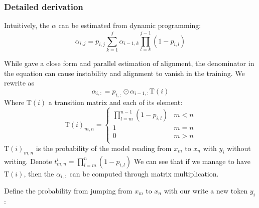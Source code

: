 \subsubsection{Detailed derivation}
\label{app:emma_estimation}
Intuitively, the $\alpha$ can be estimated from dynamic programming:
\begin{equation}
    \alpha_{i,j} = p_{i,j} \sum_{k=1}^j \alpha_{i-1, k} \prod_{l=k}^{j-1}(1 - p_{i,l})
    \label{eq:alpha_orig}
\end{equation}

While 
\citep{raffel_online_2017}
gave a close form and parallel estimation of alignment,
the denominator in the equation can cause instability and alignment to vanish in the training.
We rewrite  as 
\begin{equation}
    \alpha_{i,:} = p_{i,:} \odot \alpha_{i-1, :} \mathrm{T}(i)  
\end{equation}
Where $\mathrm{T}(i)$ a transition matrix and each of its element:
\begin{equation}
    \mathrm{T}(i)_{m,n} =
    \begin{cases}
    \prod_{l=m}^{n-1} (1 - p_{i,l}) & m < n\\
    1 & m = n\\
    0 & m > n \\
    \end{cases}
\end{equation}
$\mathrm{T}(i)_{m,n}$ is the probability of the model reading from $x_m$ to $x_n$ with $y_{i}$ without writing.
Denote $t^{i}_{m,n} = \prod_{l=m}^{n} (1 - p_{i,l}) $
We can see that if we manage to have $\mathrm{T}(i)$, then the
$\alpha_{i, :}$ can be computed through matrix multiplication.

Define the probability from jumping from $x_m$ to $x_n$ with our write a new token $y_i$:

